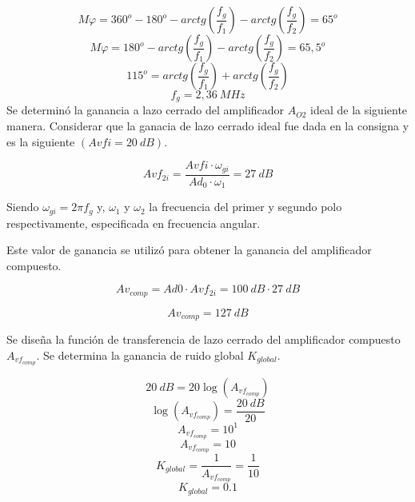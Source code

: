 \begin{equation}
    M \varphi = 360^o - 180^o - arctg \left( \frac{f_g}{f_1} \right) - arctg \left( \frac{f_g}{f_2} \right) = 65^o
\end{equation}
\begin{equation}
    M \varphi = 180^o - arctg \left( \frac{f_g}{f_1} \right) - arctg \left( \frac{f_g}{f_2} \right) = 65,5^o
\end{equation}
\begin{equation}
    115^o = arctg \left( \frac{f_g}{f_1} \right) + arctg \left( \frac{f_g}{f_2} \right)
\end{equation}
\begin{equation}
    \boxed{
    f_g = 2,36~MHz
    }
\end{equation}
\bigskip
\hspace{1mm} Se determinó la ganancia a lazo cerrado del amplificador \(A_{O2}\) ideal de la siguiente manera. Considerar que la ganacia de lazo cerrado ideal fue dada en la consigna y es la siguiente \((Avfi=20~dB)\).


\begin{equation}
    Avf_{2i}=\frac{Avfi \cdot \omega_{gi}}{Ad_0 \cdot \omega_1} = 27~dB
\end{equation}

\bigskip
\hspace{1mm} Siendo \( \omega _{gi} = 2\pi f_g \)
y, \( \omega _1 \) y  \(\omega _2\) la frecuencia del primer y segundo polo respectivamente, especificada en frecuencia angular.


\bigskip
\hspace{1mm} Este valor de ganancia se utilizó para obtener la ganancia del amplificador compuesto.

\begin{equation}
    Av_{comp}=Ad0\cdot Avf_{2i}=100~dB \cdot 27~dB
\end{equation}

\begin{equation}
    \boxed{
    Av_{comp} = 127~dB
    }
\end{equation}

\bigskip

\hspace{1mm} Se diseña la función de transferencia de lazo cerrado del amplificador compuesto \(A_{vf_{comp}}\). Se determina la ganancia de ruido global \(K_{global}\).

\[20~dB= 20 \log(A_{vf_{comp}})\]
\[\log(A_{vf_{comp}})=\frac{20~dB}{20}\]
\[A_{vf_{comp}}=10^{1}\]
\[A_{vf_{comp}}=10\]
\begin{equation}
    K_{global} = \frac{1}{A_{vf_{comp}}} = \frac{1}{10}
\end{equation}
\begin{equation}
    \boxed{
    K_{global} = 0.1
    }
\end{equation}

